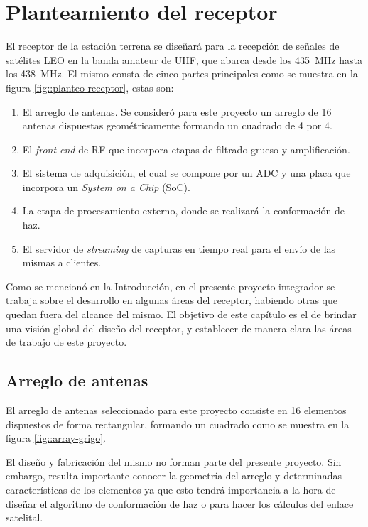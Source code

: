 \documentclass[../../main.tex]{subfiles}
\begin{document}
\graphicspath{{./figures}}
\chapter{Planteamiento del receptor}
El receptor de la estación terrena se diseñará para la recepción de señales de satélites LEO en la banda amateur de UHF, que abarca desde los 435~MHz hasta los 438~MHz. El mismo consta de cinco partes principales como se muestra en la figura \ref{fig::planteo-receptor}, estas son:

\begin{enumerate}
    \item El arreglo de antenas. Se consideró para este proyecto un arreglo de 16 antenas dispuestas geométricamente formando un cuadrado de 4 por 4.
    \item El \textit{front-end} de RF que incorpora etapas de filtrado grueso y amplificación.
    \item El sistema de adquisición, el cual se compone por un ADC y una placa que incorpora un \textit{System on a Chip} (SoC).
    \item La etapa de procesamiento externo, donde se realizará la conformación de haz.
    \item El servidor de \textit{streaming} de capturas en tiempo real para el envío de las mismas a clientes.
\end{enumerate} 

Como se mencionó en la Introducción, en el presente proyecto integrador se trabaja sobre el desarrollo en algunas áreas del receptor, habiendo otras que quedan fuera del alcance del mismo. El objetivo de este capítulo es el de brindar una visión global del diseño del receptor, y establecer de manera clara las áreas de trabajo de este proyecto.


\section{Arreglo de antenas}
El arreglo de antenas seleccionado para este proyecto consiste en 16 elementos dispuestos de forma rectangular, formando un cuadrado como se muestra en la figura \ref{fig::array-grigo}.

El diseño y fabricación del mismo no forman parte del presente proyecto. Sin embargo, resulta importante conocer la geometría del arreglo y determinadas características de los elementos ya que esto tendrá importancia a la hora de diseñar el algoritmo de conformación de haz o para hacer los cálculos del enlace satelital.
\end{document}
